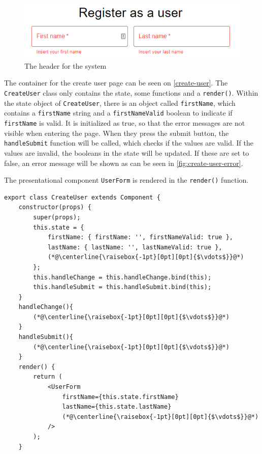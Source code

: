\begin{figure}[H]
    \includegraphics[width=\linewidth]{figures/create-user-error.png}
    \caption{The header for the system}
    \label{fig:create-user-error}
\end{figure}

The container for the create user page can be seen on \autoref{create-user}.
The \texttt{CreateUser} class only contains the state, some functions and a \texttt{render()}.
Within the state object of \texttt{CreateUser}, there is an object called \texttt{firstName}, which contains a \texttt{firstName} string and a \texttt{firstNameValid} boolean to indicate if \texttt{firstName} is valid.
It is initialized as true, so that the error messages are not visible when entering the page.
When they press the submit button, the \texttt{handleSubmit} function will be called, which checks if the values are valid.
If the values are invalid, the booleans in the state will be updated. 
If these are set to false, an error message will be shown as can be seen in \autoref{fig:create-user-error}.

The presentational component \texttt{UserForm} is rendered in the \texttt{render()} function. 
\begin{lstlisting}[caption={Component to create user}, captionpos=b, label={create-user}]
export class CreateUser extends Component {
    constructor(props) {
        super(props);
        this.state = {
            firstName: { firstName: '', firstNameValid: true },
            lastName: { lastName: '', lastNameValid: true },
            (*@\centerline{\raisebox{-1pt}[0pt][0pt]{$\vdots$}}@*)
        };
        this.handleChange = this.handleChange.bind(this);
        this.handleSubmit = this.handleSubmit.bind(this);
    }
    handleChange(){
        (*@\centerline{\raisebox{-1pt}[0pt][0pt]{$\vdots$}}@*)
    }
    handleSubmit(){
        (*@\centerline{\raisebox{-1pt}[0pt][0pt]{$\vdots$}}@*)
    }
    render() {
        return (
            <UserForm
                firstName={this.state.firstName}
                lastName={this.state.lastName}
                (*@\centerline{\raisebox{-1pt}[0pt][0pt]{$\vdots$}}@*)
            />
        );
    }
\end{lstlisting}

